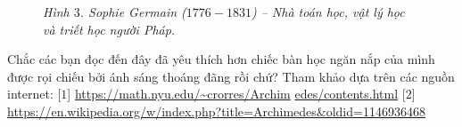 \begin{multicols}{2}
\begin{figure}[H]
		\caption{\small\textit{\color{quantoan}Hình $3$. Sophie Germain ($1776-1831$) -- Nhà toán học, vật lý học và triết học người Pháp.}}
		\vspace*{-10pt}
	\end{figure}
	Chắc các bạn đọc đến đây đã yêu thích hơn chiếc bàn học ngăn nắp của mình được rọi chiếu bởi ánh sáng thoáng đãng rồi chứ?
	\vskip 0.1cm
	Tham khảo dựa trên các nguồn internet:
	\vskip 0.1cm
	[$1$]	\url{https://math.nyu.edu/~crorres/Archim} \linebreak\url{edes/contents.html}
	\vskip 0.1cm
	[$2$]	\url{https://en.wikipedia.org/w/index.php?title=Archimedes&oldid=1146936468}
	
	
\end{multicols}